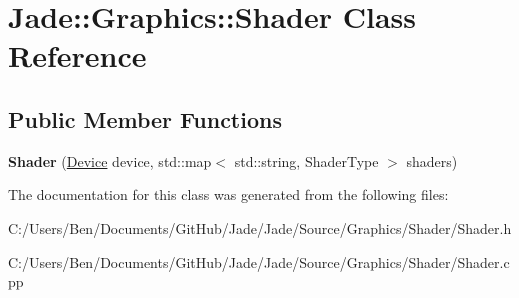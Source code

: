 \hypertarget{class_jade_1_1_graphics_1_1_shader}{}\section{Jade\+:\+:Graphics\+:\+:Shader Class Reference}
\label{class_jade_1_1_graphics_1_1_shader}
\subsection*{Public Member Functions}
\begin{DoxyCompactItemize}
\item 
\hypertarget{class_jade_1_1_graphics_1_1_shader_a6ba8cfe295f29771b8b56590ff39181b}{}{\bfseries Shader} (\hyperlink{class_jade_1_1_graphics_1_1_device}{Device} device, std\+::map$<$ std\+::string, Shader\+Type $>$ shaders)\label{class_jade_1_1_graphics_1_1_shader_a6ba8cfe295f29771b8b56590ff39181b}

\end{DoxyCompactItemize}


The documentation for this class was generated from the following files\+:\begin{DoxyCompactItemize}
\item 
C\+:/\+Users/\+Ben/\+Documents/\+Git\+Hub/\+Jade/\+Jade/\+Source/\+Graphics/\+Shader/Shader.\+h\item 
C\+:/\+Users/\+Ben/\+Documents/\+Git\+Hub/\+Jade/\+Jade/\+Source/\+Graphics/\+Shader/Shader.\+cpp\end{DoxyCompactItemize}
